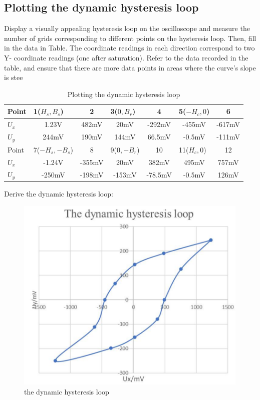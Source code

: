 \documentclass[UTF8]{article}
\begin{document}
   \subsection{Plotting the dynamic hysteresis loop}
   Display a visually appealing hysteresis loop on the oscilloscope and measure the number of grids corresponding to different points on the hysteresis loop. Then, fill in the data in Table. The coordinate readings in each direction correspond to two Y- coordinate readings (one after saturation). Refer to the data recorded in the table, and ensure that there are more data points in areas where the curve's slope is stee
   \begin{table}[htbp]
     \centering
     \caption{Plotting the dynamic hysteresis loop}
       \begin{tabular}{lcccccc}
       \toprule[2pt]
       Point & \multicolumn{1}{l}{1($H_s , B_s$)} & 2     & \multicolumn{1}{l}{3($0, B_r$)} & 4     & \multicolumn{1}{l}{5($−H_c , 0$)} & 6 \\
       \midrule
       $U_x$   & 1.23V  & 482mV   & 20mV    & -292mV  & -455mV  & -617mV \\
       $U_y$   & 244mV   & 190mV   & 144mV   & 66.5mV  & -0.5mV  & -111mV \\
       \bottomrule[1.5pt]
       Point & \multicolumn{1}{l}{7($-H_s , −B_s$)} & 8     & \multicolumn{1}{l}{9($0, −B_r$)} & 10    & \multicolumn{1}{l}{11($H_c , 0$)} & 12 \\
       \midrule
       $U_x$   & -1.24V & -355mV & 20mV    & 382mV   & 495mV   & 757mV \\
       $U_y$   & -250mV  & -198mV  & -153mV  & -78.5mV & -0.5mV  & 126mV \\
       \bottomrule[2pt]
       \end{tabular}%
     \label{tab:addlabel}%
   \end{table}%
   
   Derive the dynamic hysteresis loop:
            \begin{figure}[H]
                  	    	\centering
                  	    	\includegraphics[clip,scale=1.2,trim={0 0 0 0}]{fig/fig12.png}
                  	        \caption{the dynamic hysteresis loop}
                  	        \label{figure.1}
                      \end{figure}  
                      
\end{document}
